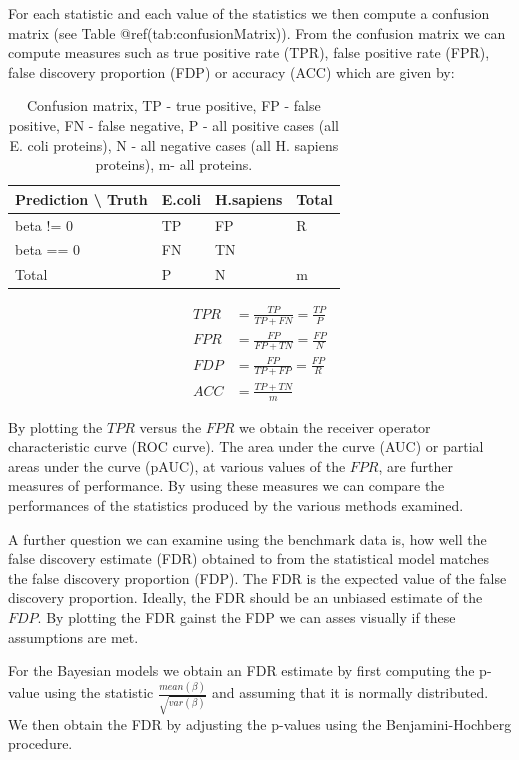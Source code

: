 \documentclass[journal=jacsat,manuscript=article]{achemso}
\begin{document}
For each statistic and each value of the statistics we then compute a
confusion matrix (see Table @ref(tab:confusionMatrix)). From the
confusion matrix we can compute measures such as true positive rate
(TPR), false positive rate (FPR), false discovery proportion (FDP) or
accuracy (ACC) which are given by:

\begin{table}

\caption{\label{tab:confusionMatrix}Confusion matrix, TP - true positive, FP - false positive, FN - false negative, P - all positive cases (all E. coli proteins), N - all negative cases (all H. sapiens proteins), m- all proteins.}
\centering
\begin{tabular}[t]{l|l|l|l}
\hline
Prediction \textbackslash{} Truth & E.coli & H.sapiens & Total\\
\hline
beta != 0 & TP & FP & R\\
\hline
beta == 0 & FN & TN & \\
\hline
Total & P & N & m\\
\hline
\end{tabular}
\end{table}

\[
\begin{aligned}
TPR &= \frac{TP}{TP+FN} = \frac{TP}{P}\\
FPR &= \frac{FP}{FP+TN} = \frac{FP}{N}\\
FDP &= \frac{FP}{TP + FP} = \frac{FP}{R}\\
ACC &= \frac{TP + TN}{m}
\end{aligned}
\]

By plotting the \(TPR\) versus the \(FPR\) we obtain the receiver
operator characteristic curve (ROC curve). The area under the curve
(AUC) or partial areas under the curve (pAUC), at various values of the
\(FPR\), are further measures of performance. By using these measures we
can compare the performances of the statistics produced by the various
methods examined.

A further question we can examine using the benchmark data is, how well
the false discovery estimate (FDR) obtained to from the statistical
model matches the false discovery proportion (FDP). The FDR is the
expected value of the false discovery proportion. Ideally, the FDR
should be an unbiased estimate of the \(FDP\). By plotting the FDR
gainst the FDP we can asses visually if these assumptions are met.

For the Bayesian models we obtain an FDR estimate by first computing the
p-value using the statistic \(\frac{mean(\beta)}{\sqrt{var(\beta)}}\)
and assuming that it is normally distributed. We then obtain the FDR by
adjusting the p-values using the Benjamini-Hochberg procedure.
\end{document}
